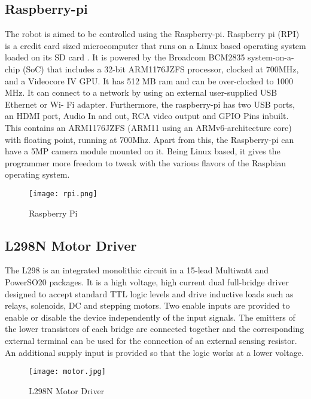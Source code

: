 \subsection{Raspberry-pi}
The robot is aimed to be controlled using the Raspberry-pi. Raspberry pi (RPI) is a credit card sized microcomputer that runs on a Linux based operating system loaded on its SD card . It is powered by the Broadcom BCM2835 system-on-a-chip (SoC) that includes a 32-bit ARM1176JZFS processor, clocked at 700MHz, and a Videocore IV GPU. It has 512 MB ram and can be over-clocked to 1000 MHz. It can connect to a network by using an external user-supplied USB Ethernet or Wi- Fi adapter. Furthermore, the raspberry-pi has two USB ports, an HDMI port, Audio In and out, RCA video output and GPIO Pins inbuilt. This contains an ARM1176JZFS (ARM11 using an ARMv6-architecture core) with floating point, running at 700Mhz. Apart from this, the Raspberry-pi can have a 5MP camera module mounted on it. Being Linux based, it gives the programmer more freedom to tweak with the various flavors of the Raspbian operating system.

\begin{figure}[H]
  \centering
  \texttt{[image: rpi.png]}
  \caption{Raspberry Pi}
  \label{RPi}	
\end{figure}

\subsection{L298N Motor Driver}
The L298 is an integrated monolithic circuit in a 15-lead Multiwatt and PowerSO20 packages. It is a high voltage, high current dual full-bridge driver designed to accept standard TTL logic levels and drive inductive loads such as relays, solenoids, DC and stepping motors. Two enable inputs are provided to enable or disable the device independently of the input signals. The emitters of the lower transistors of each bridge are connected together and the corresponding external terminal can be used for the connection of an external sensing resistor. An additional supply input is provided so that the logic works at a lower voltage.

\begin{figure}[H]
  \centering
  \texttt{[image: motor.jpg]}
  \caption{L298N Motor Driver}
  \label{L298N motor driver}	
\end{figure}



